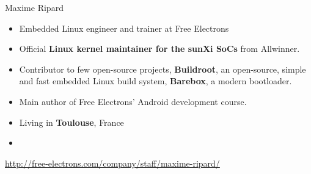\begin{frame}{Maxime Ripard}
    \begin{itemize}
	\item Embedded Linux engineer and trainer at Free Electrons
	\item Official {\bf Linux kernel maintainer for the sunXi SoCs}
	      from Allwinner.
	\item Contributor to few open-source projects, {\bf Buildroot}, an
	      open-source, simple and fast embedded Linux build system,
	     {\bf Barebox}, a modern bootloader.
	\item Main author of Free Electrons' Android development course.
	\item Living in {\bf Toulouse}, France
	\item {}
    \end{itemize}
    {\small \url{http://free-electrons.com/company/staff/maxime-ripard/}}
\end{frame}
